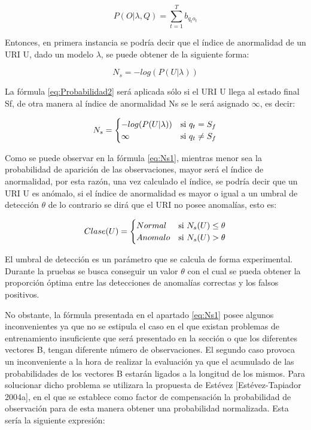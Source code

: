 \begin{equation}
P(O|\lambda,Q) = \sum_{t=1}^{T}b_{q_{t}o_{t}}
\end{equation}

Entonces, en primera instancia se podría decir que el índice de anormalidad de un URI U, dado un modelo $\lambda$, se puede obtener de la siguiente forma:

\begin{equation}\label{eq:Probabilidad2}
N_{s} = -log(P(U|\lambda))
\end{equation}

La fórmula \ref{eq:Probabilidad2} será aplicada sólo si el URI U llega al estado final Sf, de otra manera al índice de anormalidad Ns se le será asignado $\infty$, es decir:

\begin{equation}\label{eq:Ns1}
N_{s} = 
	\begin{cases} 
      -log(P(U|\lambda)) & $si $  q_{t} = S_{f} \\
      \infty & $si $  q_{t} \neq S_{f} \\ 
   \end{cases}
\end{equation}

Como se puede observar en la fórmula \ref{eq:Ns1}, mientras menor sea la probabilidad de aparición de las observaciones, mayor será el índice de anormalidad, por esta razón, una vez calculado el índice, se podría decir que un URI U es anómalo, si el índice de anormalidad es mayor o igual a un umbral de detección $\theta$ de lo contrario se dirá que el URI no posee anomalías, esto es:

\begin{equation}\label{eq:ClaseU}
Clase(U) = 
	\begin{cases} 
      Normal & $si $  N_{s}(U) \leq \theta \\
      Anomalo & $si $  N_{s}(U) > \theta \\ 
   \end{cases}
\end{equation}


El umbral de detección es un parámetro que se calcula de forma experimental. Durante la pruebas se busca conseguir un valor $\theta$ con el cual se pueda obtener la proporción óptima entre las detecciones de anomalías correctas y los falsos positivos. 

No obstante, la fórmula presentada en el apartado \ref{eq:Ns1} posee algunos inconvenientes ya que no se estipula el caso en el que existan problemas de entrenamiento insuficiente que será presentado en la sección o que los diferentes vectores B, tengan diferente número de observaciones. El segundo caso provoca un inconveniente a la hora de realizar la evaluación ya que el acumulado de las probabilidades de los vectores B estarán ligados a la longitud de los mismos. Para solucionar dicho problema se utilizara la propuesta de Estévez [Estévez-Tapiador 2004a], en el que se establece como factor de compensación la probabilidad de observación para de esta manera obtener una probabilidad normalizada. Esta sería la siguiente expresión:


